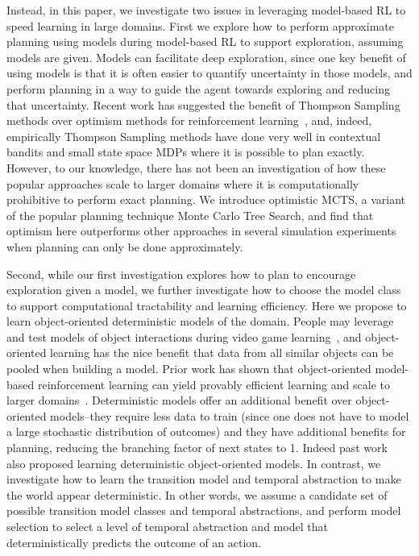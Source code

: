 Instead, in this paper, we investigate two issues in leveraging model-based RL to speed learning in large domains. First we explore how to perform approximate planning using models during model-based RL to support  exploration, assuming models are given.
Models can facilitate deep exploration, since one key benefit of using models is that it is often easier to quantify uncertainty in those models, and perform planning in a way to guide the agent towards exploring and reducing that uncertainty. Recent work has suggested the benefit of Thompson Sampling methods over optimism methods for reinforcement learning~\citep{osband2016posterior}, and, indeed, empirically Thompson Sampling methods have done very well in contextual bandits and small state space MDPs where it is possible to plan exactly. However, to our knowledge, there has not been an investigation of how these popular approaches scale to larger domains where it is computationally prohibitive to perform exact planning. We introduce optimistic MCTS, a variant of the popular planning technique Monte Carlo Tree Search, %
and find that optimism here outperforms other approaches in several simulation experiments when planning can only be done approximately.

Second, while our first investigation explores how to plan to encourage exploration given a model, we further investigate how to choose the model class to support computational tractability and learning efficiency. Here we propose to learn object-oriented deterministic models of the domain. People may leverage and test models of object interactions during video game learning~\citep{tsividis2017human, dubey2018investigating}, and object-oriented learning has the nice benefit that data from all similar objects can be pooled when building a model. Prior work has shown that object-oriented model-based reinforcement learning can yield provably efficient learning and scale to larger domains~\citep{diuk2008object}. Deterministic models offer an additional benefit over object-oriented models--they require less data to train (since one does not have to model a large stochastic distribution of outcomes) and they have additional benefits for planning, reducing the branching factor of next states to 1. Indeed past work~\citep{diuk2008object} also proposed learning deterministic object-oriented models. In contrast, we investigate how to learn the transition model and temporal abstraction to make the world appear deterministic. In other words, we assume a candidate set of possible transition model classes and temporal abstractions, and perform model selection to select a level of temporal abstraction and model that deterministically predicts the outcome of an action. %

